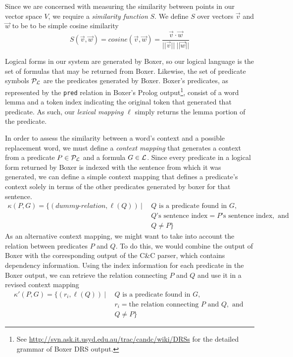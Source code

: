Since we are concerned with measuring the similarity between points in our
vector space $V$, we require a {\it similarity function} $S$.  We define $S$
over vectors $\vec v$ and $\vec w$ to be to be simple cosine similarity \[
S(\vec v, \vec w) = cosine(\vec v, \vec w) = \frac{\vec v \cdot \vec w}{||\vec
v||~||\vec w||}\]

Logical forms in our system are generated by Boxer, so our logical language
\loglang is the set of formulas that may be returned from Boxer.  Likewise, the
set of predicate symbols ${\cal{P}}_{{\cal{L}}}$ are the predicates generated by
Boxer. Boxer's predicates, as represented by the {\tt pred} relation in Boxer's
Prolog output\footnote{See
\url{http://svn.ask.it.usyd.edu.au/trac/candc/wiki/DRSs} for the detailed
grammar of Boxer DRS output.}, consist of a word lemma and a token index
indicating the original token that generated that predicate.  As such, our 
\emph{lexical mapping} $\ell$ simply returns the lemma portion of the predicate.

In order to assess the similarity between a word's context and a possible
replacement word, we must define a \textit{context mapping} that generates a
context from a predicate $P \in {\cal{P}}_{{\cal{L}}}$ and a formula $G \in
{\cal{L}}$.  Since every predicate in a logical form returned by Boxer is indexed
with the sentence from which it was generated, we can define a simple context
mapping that defines a predicate's context solely in terms of the other
predicates generated by boxer for that sentence.
\begin{align*}
\kappa(P,G) = \{ (dummy\text{-}relation, \ell(Q)) ~|~ 
&~Q \text{ is a predicate found in } G, \\
&~Q\text{'s sentence index} = P\text{'s sentence index}, \text{ and } \\
&~Q \neq P \}
\end{align*}
As an alternative context mapping, we might want to take into
account the relation between predicates $P$ and $Q$.  To do this, we would
combine the output of Boxer with the corresponding output of the C\&C parser,
which contains dependency information.  Using the index information for each
predicate in the Boxer output, we can retrieve the relation connecting $P$ and
$Q$ and use it in a revised context mapping
\begin{align*}
\kappa'(P,G) = \{ (r_i, \ell(Q)) ~|~ 
&~Q \text{ is a predicate found in } G, \\
&~r_i = \text{the relation connecting } P \text{ and } Q, \text{ and } \\
&~Q \neq P \}
\end{align*}

